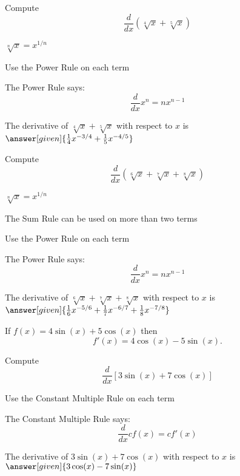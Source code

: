\documentclass{ximera}
\begin{document}
\begin{problem} %
  Compute 
  \[
  \frac{d}{dx} \left(\sqrt[4] x + \sqrt[5] x\right)
  \]
  
    \begin{hint}
		 $\sqrt[n] x = x^{1/n}$
		\end{hint}
		\begin{hint}
      Use the Power Rule on each term
    \end{hint}
    \begin{hint}
      The Power Rule says:
      \[
      \frac{d}{dx} x^n = nx^{n-1}
      \]
    \end{hint}    
		The derivative of $\sqrt[4] x + \sqrt[5] x$ with respect to $x$ is
		 $\answer[given]{\frac14 x^{-3/4} + \frac15 x^{-4/5}}$
	
\end{problem}


\begin{problem} %
  Compute 
  \[
  \frac{d}{dx} \left(\sqrt[6] x + \sqrt[7] x + \sqrt[8] x\right)
  \]
  
    \begin{hint}
		 $\sqrt[n] x = x^{1/n}$
		\end{hint}
		\begin{hint}
		  The Sum Rule can be used on more than two terms
		\end{hint}
		\begin{hint}
      Use the Power Rule on each term
    \end{hint}
    \begin{hint}
      The Power Rule says:
      \[
      \frac{d}{dx} x^n = nx^{n-1}
      \]
    \end{hint}    
		The derivative of $\sqrt[6] x + \sqrt[7] x + \sqrt[8] x$ with respect to $x$ is
		 $\answer[given]{\frac16 x^{-5/6} + \frac17 x^{-6/7} + \frac18 x^{-7/8}}$
	
\end{problem}

\begin{example} %
 If $f(x) = 4\sin(x) + 5\cos(x)$ then 
\[f'(x) = 4\cos(x) - 5\sin(x).\]
\end{example}


\begin{problem} %
  Compute 
  \[
  \frac{d}{dx} \left[3\sin(x) + 7\cos(x)\right]
  \]
  
		\begin{hint}
      Use the Constant Multiple Rule on each term
    \end{hint}
    \begin{hint}
      The Constant Multiple Rule says:
      \[
      \frac{d}{dx} cf(x) = cf'(x)
      \]
    \end{hint}    
		The derivative of $3\sin(x) + 7\cos(x)$ with respect to $x$ is
		 $\answer[given]{3\cos(x) - 7\sin(x)}$
	
\end{problem}
\end{document}
